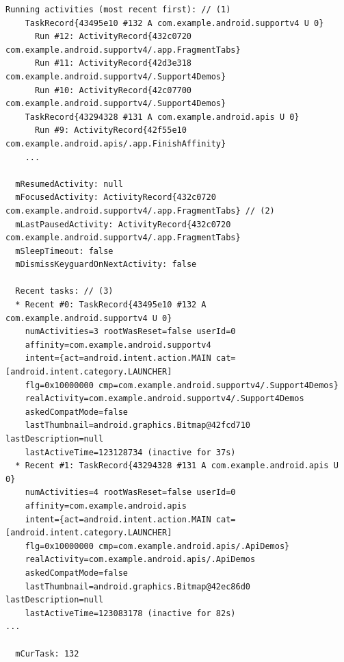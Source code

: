 \begin{lstlisting}[frame=single]
  Running activities (most recent first): // (1)
    TaskRecord{43495e10 #132 A com.example.android.supportv4 U 0}
      Run #12: ActivityRecord{432c0720 com.example.android.supportv4/.app.FragmentTabs}
      Run #11: ActivityRecord{42d3e318 com.example.android.supportv4/.Support4Demos}
      Run #10: ActivityRecord{42c07700 com.example.android.supportv4/.Support4Demos}
    TaskRecord{43294328 #131 A com.example.android.apis U 0}
      Run #9: ActivityRecord{42f55e10 com.example.android.apis/.app.FinishAffinity}
	...
 
  mResumedActivity: null
  mFocusedActivity: ActivityRecord{432c0720 com.example.android.supportv4/.app.FragmentTabs} // (2)
  mLastPausedActivity: ActivityRecord{432c0720 com.example.android.supportv4/.app.FragmentTabs}
  mSleepTimeout: false
  mDismissKeyguardOnNextActivity: false

  Recent tasks: // (3)
  * Recent #0: TaskRecord{43495e10 #132 A com.example.android.supportv4 U 0}
    numActivities=3 rootWasReset=false userId=0
    affinity=com.example.android.supportv4
    intent={act=android.intent.action.MAIN cat=[android.intent.category.LAUNCHER] 
    flg=0x10000000 cmp=com.example.android.supportv4/.Support4Demos}
    realActivity=com.example.android.supportv4/.Support4Demos
    askedCompatMode=false
    lastThumbnail=android.graphics.Bitmap@42fcd710 lastDescription=null
    lastActiveTime=123128734 (inactive for 37s)
  * Recent #1: TaskRecord{43294328 #131 A com.example.android.apis U 0}
    numActivities=4 rootWasReset=false userId=0
    affinity=com.example.android.apis
    intent={act=android.intent.action.MAIN cat=[android.intent.category.LAUNCHER] 
    flg=0x10000000 cmp=com.example.android.apis/.ApiDemos}
    realActivity=com.example.android.apis/.ApiDemos
    askedCompatMode=false
    lastThumbnail=android.graphics.Bitmap@42ec86d0 lastDescription=null
    lastActiveTime=123083178 (inactive for 82s)
...

  mCurTask: 132          
\end{lstlisting}
\lstset{basicstyle=\ttfamily\footnotesize}

